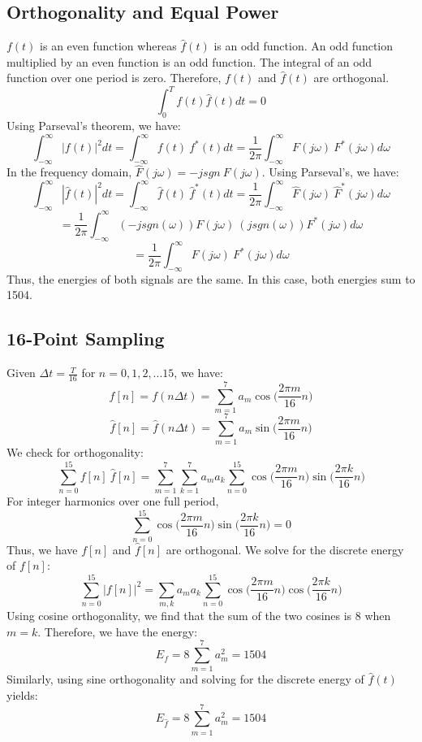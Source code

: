 \documentclass{article}
\begin{document}
\subsection*{Orthogonality and Equal Power}
\(f(t)\) is an even function whereas \(\hat{f}(t)\) is an odd function. An odd function multiplied by an even function is an odd function. The integral of an odd function over one period is zero. Therefore, \(f(t)\) and \(\hat{f}(t)\) are orthogonal.
\[
\int_{0}^{T} f(t) \hat{f}(t) dt = 0
\]
Using Parseval's theorem, we have:
\[
\int_{-\infty}^{\infty} |f(t)|^2 dt = \int_{-\infty}^{\infty} f(t) \ f^*(t) dt
= \frac{1}{2\pi}\int_{-\infty}^{\infty} F(j\omega) \ F^*(j\omega) d\omega
\]
In the frequency domain, \(\hat{F}(j\omega) = -j sgn \ F(j\omega)\). Using Parseval's, we have:
\[
\int_{-\infty}^{\infty} |\hat{f}(t)|^2 dt = \int_{-\infty}^{\infty} \hat{f}(t) \ \hat{f}^*(t) dt
= \frac{1}{2\pi}\int_{-\infty}^{\infty} \hat{F}(j\omega) \ \hat{F}^*(j\omega) d\omega
\]
\[
= \frac{1}{2\pi}\int_{-\infty}^{\infty} (-j sgn(\omega))F(j\omega) \ (jsgn(\omega))F^*(j\omega)d\omega
\]
\[
= \frac{1}{2\pi}\int_{-\infty}^{\infty} F(j\omega) \ F^*(j\omega) d\omega
\]
Thus, the energies of both signals are the same. In this case, both energies sum to 1504.

\subsection*{16-Point Sampling}
Given \(\Delta t = \frac{T}{16}\) for \(n=0, 1, 2, ...15\), we have:
\[
f[n] = f(n\Delta t) = \sum_{m=1}^{7}a_m \cos\bigg(\frac{2\pi m}{16}n\bigg)
\]
\[
\hat{f}[n] = \hat{f}(n\Delta t) = \sum_{m=1}^{7}a_m \sin\bigg(\frac{2\pi m}{16}n\bigg)
\]
We check for orthogonality:
\[
\sum_{n=0}^{15} f[n] \ \hat{f}[n] = \sum_{m=1}^{7} \sum_{k=1}^{7} a_m a_k \sum_{n=0}^{15} 
\cos\bigg(\frac{2\pi m}{16}n \bigg) \sin\bigg(\frac{2\pi k}{16}n \bigg)
\]
For integer harmonics over one full period, 
\[
\sum_{n=0}^{15} \cos\bigg(\frac{2\pi m}{16}n \bigg) \sin\bigg(\frac{2\pi k}{16}n \bigg) = 0
\]
Thus, we have \(f[n]\) and \(\hat{f}[n]\) are orthogonal. We solve for the discrete energy of \(f[n]\):
\[
\sum_{n=0}^{15} |f[n]|^2 = \sum_{m,k} a_m a_k\sum_{n=0}^{15} 
\cos\bigg(\frac{2\pi m}{16}n \bigg) \cos\bigg(\frac{2\pi k}{16}n \bigg)
\]
Using cosine orthogonality, we find that the sum of the two cosines is 8 when \(m=k\). Therefore, we have the energy:
\[
E_f = 8\sum_{m=1}^{7}a^2_m = 1504
\]
Similarly, using sine orthogonality and solving for the discrete energy of \(\hat{f}(t)\) yields:
\[
E_{\hat{f}} = 8\sum_{m=1}^{7} a^2_m = 1504
\]
\end{document}
